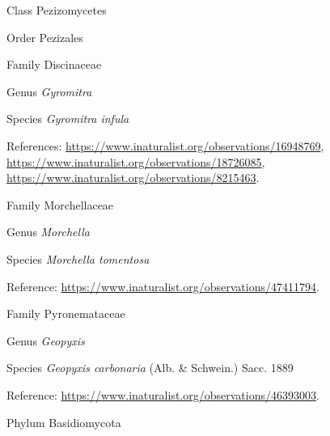 \documentclass[9pt, article]{memoir}
\begin{document}
\begin{multicols}{2}
\vspace{6pt}\noindent\hspace{12pt}Class Pezizomycetes


\vspace{6pt}\noindent\hspace{18pt}Order Pezizales


\vspace{6pt}\noindent\hspace{24pt}Family Discinaceae


\vspace{6pt}\noindent\hspace{30pt}Genus \textit{Gyromitra}


\vspace{6pt}\noindent\hspace{36pt}Species \textit{Gyromitra infula}


References: 
\url{https://www.inaturalist.org/observations/16948769}, 
\url{https://www.inaturalist.org/observations/18726085}, 
\url{https://www.inaturalist.org/observations/8215463}.

\vspace{6pt}\noindent\hspace{24pt}Family Morchellaceae


\vspace{6pt}\noindent\hspace{30pt}Genus \textit{Morchella}


\vspace{6pt}\noindent\hspace{36pt}Species \textit{Morchella tomentosa}


Reference: 
\url{https://www.inaturalist.org/observations/47411794}.

\vspace{6pt}\noindent\hspace{24pt}Family Pyronemataceae


\vspace{6pt}\noindent\hspace{30pt}Genus \textit{Geopyxis}


\vspace{6pt}\noindent\hspace{36pt}Species \textit{Geopyxis carbonaria} (Alb. \& Schwein.) Sacc. 1889


Reference: 
\url{https://www.inaturalist.org/observations/46393003}.

\vspace{6pt}\noindent\hspace{6pt}Phylum Basidiomycota



\end{multicols}
\end{document}
